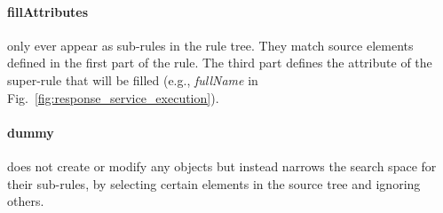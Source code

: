 
\paragraph{fillAttributes} %
\label{par:fillattributes}

only ever appear as sub-rules in the rule tree. They match source elements defined in the first part of the rule. The third part defines the attribute of the super-rule that will be filled (e.g., \emph{fullName} in Fig.~\ref{fig:response_service_execution}).


\paragraph{dummy} %
\label{par:dummy}

does not create or modify any objects but instead narrows the search space for their sub-rules, by selecting certain elements in the source tree and ignoring others.




